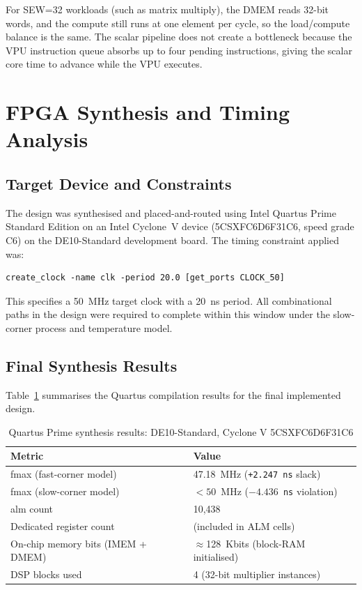For SEW=32 workloads (such as matrix multiply), the DMEM reads 32-bit words, and the
compute still runs at one element per cycle, so the load/compute balance is the same.
The scalar pipeline does not create a bottleneck because the VPU instruction queue
absorbs up to four pending instructions, giving the scalar core time to advance while
the VPU executes.

\section{FPGA Synthesis and Timing Analysis}
\label{sec:fpga_results}

\subsection{Target Device and Constraints}

The design was synthesised and placed-and-routed using Intel Quartus Prime Standard
Edition on an Intel Cyclone~V device (5CSXFC6D6F31C6, speed grade C6) on the
DE10-Standard development board. The timing constraint applied was:

\begin{verbatim}
create_clock -name clk -period 20.0 [get_ports CLOCK_50]
\end{verbatim}

This specifies a 50~MHz target clock with a 20~ns period. All combinational paths in
the design were required to complete within this window under the slow-corner process
and temperature model.

\subsection{Final Synthesis Results}

Table~\ref{tab:fpga_results} summarises the Quartus compilation results for the final
implemented design.

\begin{table}[H]
  \centering
  \caption{Quartus Prime synthesis results: DE10-Standard, Cyclone V 5CSXFC6D6F31C6}
  \label{tab:fpga_results}
  \begin{tabular}{ll}
    \toprule
    \textbf{Metric} & \textbf{Value} \\
    \midrule
    \gls{fmax} (fast-corner model)    & 47.18~MHz (\texttt{+2.247 ns} slack) \\
    \gls{fmax} (slow-corner model)    & $<50$~MHz (\texttt{$-4.436$~ns} violation) \\
    \gls{alm} count                   & 10,438 \\
    Dedicated register count          & (included in ALM cells) \\
    On-chip memory bits (IMEM + DMEM) & $\approx$128~Kbits (block-RAM initialised) \\
    DSP blocks used                   & 4 (32-bit multiplier instances) \\
    \bottomrule
  \end{tabular}
\end{table}

